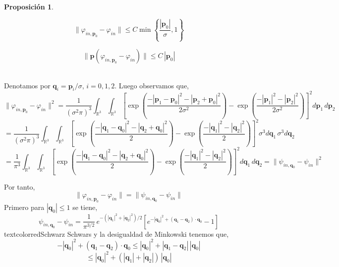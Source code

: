 \documentclass[12pt]{book}
\numberwithin{equation}{chapter}
\newtheorem{proposition}[theorem]{Proposici\'on}
\def\v{\mathbf}
\def\n{\noindent}
\def\R{\mathbb{R}}
\def\vp{\varphi}
\def\P{\mathbf{p}}
\begin{document}
\begin{proposition}
\label{p1}

\begin{equation}\label{p1.1}
\| \vp_{in,\P_{0} } -\vp_{in}  \| \leq C \min \left\{ \frac{|\P_{0}|}{\sigma} , 1  \right\}
\end{equation}

\begin{equation}\label{p1.2}
\| \P (\vp_{in,\P_{0}} -\vp_{in}) \| \leq C \, |\P_{0}|
\end{equation}

\end{proposition}

\n {\bf Demostraci\'on}\\
Denotamos por $\v{q}_{i}= \P_{i}/\sigma$, $i=0,1,2$. Luego observamos que,
$$ \| \vp_{in,\P_{0}}-\vp_{in} \|^{2} = \frac{1}{(\sigma^{2}\pi)^{3}} \int_{\R^{3}} \int_{\R^{3}} \left[ \exp\left(\frac{-|\P_{1}-\P_{0}|^{2}-|\P_{2}+\P_{0}|^{2} }{2\sigma^{2}} \right)-\exp \left(\frac{-|\P_{1}|^{2}-|\P_{2}|^{2}}{2\sigma^{2}} \right) \right]^{2} d\P_{1}\,d\P_{2} $$
$$=\frac{1}{(\sigma^{2}\pi)^{3}} \int_{\R^{3}} \int_{\R^{3}} \left[ \exp\left(\frac{-|\v{q}_{1}-\v{q}_{0}|^{2}-|\v{q}_{2}+\v{q}_{0}|^{2} }{2} \right)-\exp \left(\frac{-|\v{q}_{1}|^{2}-|\v{q}_{2}|^{2}}{2} \right) \right]^{2} \sigma^{3} d\v{q}_{1}\, \sigma^{3} d\v{q}_{2} $$
$$=\frac{1}{\pi^{3}} \int_{\R^{3}} \int_{\R^{3}} \left[ \exp\left(\frac{-|\v{q}_{1}-\v{q}_{0}|^{2}-|\v{q}_{2}+\v{q}_{0}|^{2} }{2} \right)-\exp \left(\frac{-|\v{q}_{1}|^{2}-|\v{q}_{2}|^{2}}{2} \right) \right]^{2} d\v{q}_{1}\, d\v{q}_{2} = \| \psi_{in,\v{q}_{0}}-\psi_{in} \|^{2}$$

Por tanto,
\begin{equation}\label{p1.3}
\| \vp_{in,\P_{0}}-\vp_{in} \|=\| \psi_{in,\v{q}_{0}}-\psi_{in} \|
\end{equation}
Primero para $|\v{q}_{0}|\leq 1$ se tiene,
\begin{equation}\label{p1.4}
\psi_{in,\v{q}_{0}}-\psi_{in}= \frac{1}{\pi^{3/2}} \, e^{-(|\v{q}_{1}|^{2}+|\v{q}_{2}|^{2})/2} \left[ e^{-|\v{q}_{0}|^{2}+(\v{q}_{1}-\v{q}_{2})\cdot \v{q}_{0} }-1 \right]
\end{equation}
textcolor{red}{Schwarz}
 Schwars y la desigualdad de Minkowski tenemos que,
$$ -|\v{q}_{0}|^{2}+( \v{q}_{1}-\v{q}_{2} )\cdot \v{q}_{0} \leq |\v{q}_{0}|^{2} +|\v{q}_{1}-\v{q}_{2}|\, |\v{q}_{0}|$$
$$ \leq |\v{q}_{0}|^{2} + (|\v{q}_{1}|+|\v{q}_{2}|)\, |\v{q}_{0}| $$
\end{document}
